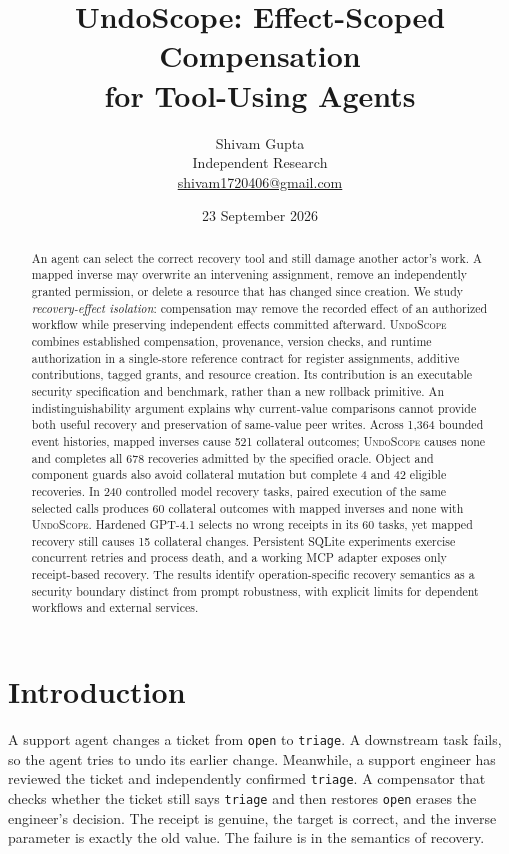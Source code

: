 \documentclass[10pt,twocolumn]{article}
\title{\vspace{-1.1em}\textbf{UndoScope: Effect-Scoped Compensation\\for Tool-Using Agents}}
\author{Shivam Gupta\\\small Independent Research\\\small\href{mailto:shivam1720406@gmail.com}{shivam1720406@gmail.com}}
\date{23 September 2026}
\newcommand{\US}{\textsc{UndoScope}}
\begin{document}
\maketitle
\begin{abstract}
An agent can select the correct recovery tool and still damage another actor's work. A mapped inverse may overwrite an intervening assignment, remove an independently granted permission, or delete a resource that has changed since creation. We study \emph{recovery-effect isolation}: compensation may remove the recorded effect of an authorized workflow while preserving independent effects committed afterward. \US{} combines established compensation, provenance, version checks, and runtime authorization in a single-store reference contract for register assignments, additive contributions, tagged grants, and resource creation. Its contribution is an executable security specification and benchmark, rather than a new rollback primitive. An indistinguishability argument explains why current-value comparisons cannot provide both useful recovery and preservation of same-value peer writes. Across 1,364 bounded event histories, mapped inverses cause 521 collateral outcomes; \US{} causes none and completes all 678 recoveries admitted by the specified oracle. Object and component guards also avoid collateral mutation but complete 4 and 42 eligible recoveries. In 240 controlled model recovery tasks, paired execution of the same selected calls produces 60 collateral outcomes with mapped inverses and none with \US{}. Hardened GPT-4.1 selects no wrong receipts in its 60 tasks, yet mapped recovery still causes 15 collateral changes. Persistent SQLite experiments exercise concurrent retries and process death, and a working MCP adapter exposes only receipt-based recovery. The results identify operation-specific recovery semantics as a security boundary distinct from prompt robustness, with explicit limits for dependent workflows and external services.
\end{abstract}

\section{Introduction}
A support agent changes a ticket from \texttt{open} to \texttt{triage}. A downstream task fails, so the agent tries to undo its earlier change. Meanwhile, a support engineer has reviewed the ticket and independently confirmed \texttt{triage}. A compensator that checks whether the ticket still says \texttt{triage} and then restores \texttt{open} erases the engineer's decision. The receipt is genuine, the target is correct, and the inverse parameter is exactly the old value. The failure is in the semantics of recovery.
\end{document}
